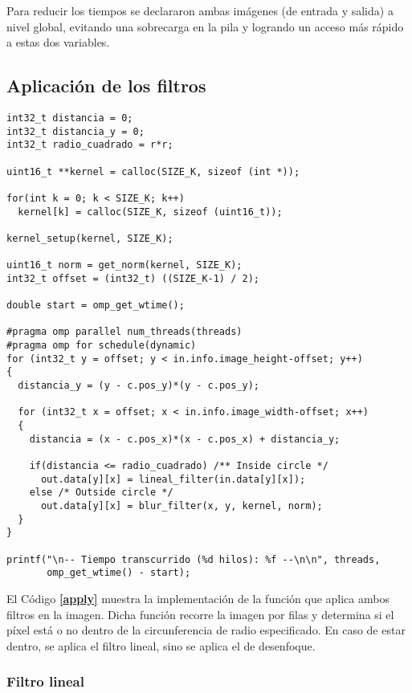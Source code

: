 \documentclass[12pt,a4paper]{article}
\begin{document}
Para reducir los tiempos se declararon ambas imágenes (de entrada y salida) a
nivel global, evitando una sobrecarga en la pila y logrando un acceso más rápido
a estas dos variables\cite{global}.

\subsection{Aplicación de los filtros}

\begin{lstlisting}[caption={Función `\emph{apply\_filters}'.}, label={apply}, language=Ce]
int32_t distancia = 0;
int32_t distancia_y = 0;
int32_t radio_cuadrado = r*r;

uint16_t **kernel = calloc(SIZE_K, sizeof (int *));

for(int k = 0; k < SIZE_K; k++)
  kernel[k] = calloc(SIZE_K, sizeof (uint16_t));

kernel_setup(kernel, SIZE_K);

uint16_t norm = get_norm(kernel, SIZE_K);
int32_t offset = (int32_t) ((SIZE_K-1) / 2);

double start = omp_get_wtime();

#pragma omp parallel num_threads(threads)
#pragma omp for schedule(dynamic)
for (int32_t y = offset; y < in.info.image_height-offset; y++)
{
  distancia_y = (y - c.pos_y)*(y - c.pos_y);

  for (int32_t x = offset; x < in.info.image_width-offset; x++)
  {
    distancia = (x - c.pos_x)*(x - c.pos_x) + distancia_y;

    if(distancia <= radio_cuadrado) /** Inside circle */
      out.data[y][x] = lineal_filter(in.data[y][x]);
    else /* Outside circle */
      out.data[y][x] = blur_filter(x, y, kernel, norm);
  }
}

printf("\n-- Tiempo transcurrido (%d hilos): %f --\n\n", threads,
       omp_get_wtime() - start);
\end{lstlisting}

El Código \textbf{\ref{apply}} muestra la implementación de la función que
aplica ambos filtros en la imagen. Dicha función recorre la imagen por filas y
determina si el píxel está o no dentro de la circunferencia de radio especificado.
En caso de estar dentro, se aplica el filtro lineal, sino se aplica el de
desenfoque.


\subsubsection{Filtro lineal}
\label{msg_h}
\end{document}
